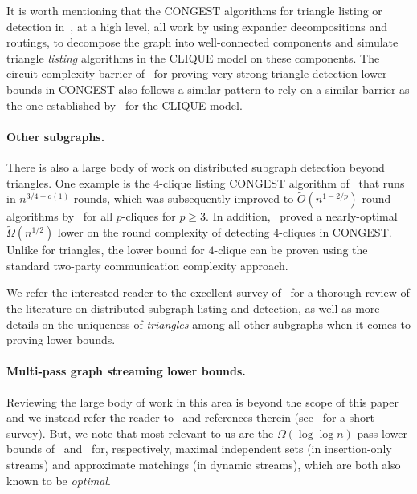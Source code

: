 \documentclass[11pt]{article}
\theoremstyle{definition}
\renewcommand{\geq}{\geqslant}
\newcommand{\Ot}{\ensuremath{\widetilde{O}}}
\newcommand{\Omgt}{\ensuremath{\widetilde{\Omega}}}
\begin{document}
It is worth mentioning that the  CONGEST algorithms for triangle listing or detection in~\cite{ChangPZ19,ChangS19,ChangS20,CHLV22,ChangHS24}, at a high level, all work by using expander decompositions and routings, 
to decompose the graph into well-connected components and simulate triangle \emph{listing} algorithms in the CLIQUE model on these components. The circuit complexity barrier of~\cite{EdenFFKO22} 
for proving very strong triangle detection lower bounds in CONGEST also follows a similar pattern to rely on a similar barrier as the one established by~\cite{DruckerKO14} for the CLIQUE model. 

\paragraph{Other subgraphs.} There is also a large body of work on distributed subgraph detection beyond triangles. 
One example is the $4$-clique listing CONGEST algorithm of~\cite{EdenFFKO22} that runs in $n^{3/4+o(1)}$ rounds, which was subsequently improved to $\Ot(n^{1-2/p})$-round algorithms by~\cite{CensorHillelCG21,CHLV22,ChangHS24}
for all $p$-cliques for $p \geq 3$. In addition,~\cite{CzumajK18} proved a nearly-optimal $\Omgt(n^{1/2})$ lower on the round complexity of detecting $4$-cliques in CONGEST. Unlike for triangles, 
the lower bound for $4$-clique can be proven using the standard two-party communication complexity approach. %

We refer the interested reader to the excellent survey of~\cite{CH22} for a thorough review of the literature on distributed subgraph listing and detection, as well as more details on the 
uniqueness of \emph{triangles} among all other subgraphs when it comes to proving lower bounds. 

\paragraph{Multi-pass graph streaming lower bounds.} Reviewing the large body of work in this area is beyond the scope of this paper and 
we instead refer the reader to~\cite{GuruswamiO16,AssadiKSY20,AssadiR20,ChenKPSSY21,KolPSY23,ChenKPSSY23,AssadiS23,AssadiGLMM24,KonradN24,AssadiKNS24,AssadiKZ24,AssadiBKNS25} and references therein (see~\cite{Assadi23} for a short survey). But, we note that most relevant to us are the $\Omega(\log\log{n})$ pass lower bounds of~\cite{AssadiKNS24} and~\cite{AssadiBKNS25} for, respectively, maximal independent sets (in insertion-only streams) and approximate matchings (in dynamic streams), which are both also known to be \emph{optimal}. 
\end{document}
